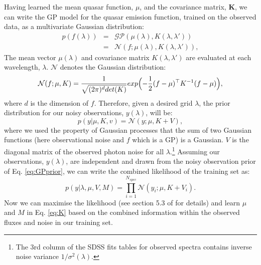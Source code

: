 \documentclass[fleqn,usenatbib]{mnras}
\begin{document}
Having learned the mean quasar function, $\mu$, and
the covariance matrix, $\mathbf{K}$, we can write
the GP model for the quasar
emission function, trained on the observed data, as a multivariate Gaussian distribution:
\begin{equation}
\begin{split}
  p(f(\lambda)) & = & \mathcal{GP}(\mu(\lambda), K(\lambda, \lambda'))  \\
  & = & \mathcal{N}(f; \mu(\lambda), K(\lambda, \lambda')),
  \label{eq:conti}
\end{split}
\end{equation}
The mean vector $\mu(\lambda)$ and covariance matrix $K(\lambda, \lambda')$ are evaluated at each wavelength, $\lambda$. $\mathcal{N}$ denotes the Gaussian distribution:
\begin{equation}
\mathcal{N}(f; \mu, K) = \frac{1}{\sqrt{(2\pi)^d det(K)}}exp\Bigl( -\frac{1}{2} (f-\mu)^{\top} K^{-1} (f-\mu)\Bigr),
\end{equation}
where $d$ is the dimension of $f$. Therefore,
given a desired grid $\lambda$, the prior distribution for our noisy observations, $y(\lambda)$, will be:
\begin{equation}
  p(y| \mu, K, v ) = \mathcal{N}(y; \mu, K + V),
  \label{eq:GPprior}
\end{equation}
where we used the property of Gaussian processes that the
sum of two Gaussian functions (here observational noise and $f$ which is a GP)
is a Gaussian. $V$ is the diagonal matrix of the observed photon noise for all $\lambda$.\footnote{The 3rd column of the SDSS fits tables
for observed spectra contains inverse noise variance $1/\sigma^2(\lambda)$.}
Assuming our observations, $y(\lambda)$,  are independent  and
drawn from the noisy observation prior of Eq. \ref{eq:GPprior}, we can write the combined likelihood of the training set as:
 \begin{equation}
  p(y | \lambda, \mu, V, M) = \prod_{i=1}^{N_{spec}}\mathcal{N}(y_i; \mu, K+V_i).
 \end{equation}
Now we can maximise the likelihood (see  section 5.3 of \cite{romanDLA} for
 details) and learn $\mu$ and $M$ in Eq. \ref{eq:K} based on the combined
 information within the observed fluxes and noise in our training set.

\end{document}
